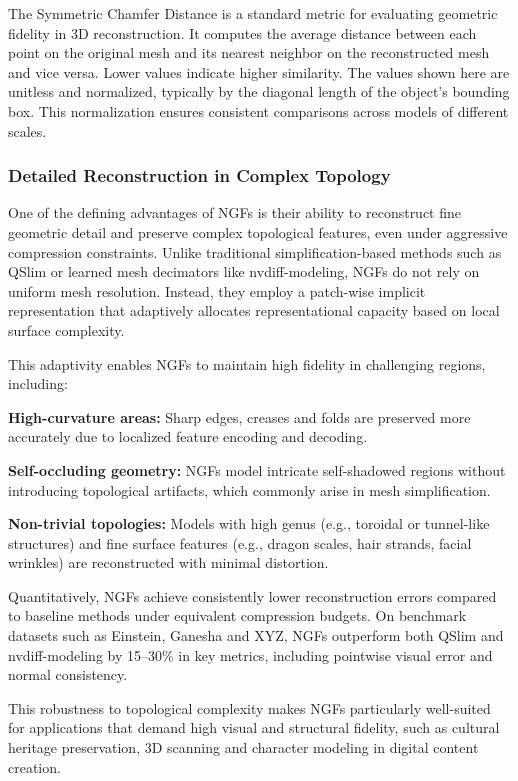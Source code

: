 The Symmetric Chamfer Distance is a standard metric for evaluating geometric fidelity in 3D reconstruction. 
It computes the average distance between each point on the original mesh and its nearest neighbor on the reconstructed mesh and vice versa. 
Lower values indicate higher similarity. 
The values shown here are unitless and normalized, typically by the diagonal length of the object’s bounding box. 
This normalization ensures consistent comparisons across models of different scales. 

\subsubsection{Detailed Reconstruction in Complex Topology}

One of the defining advantages of NGFs is their ability to reconstruct fine geometric detail and preserve complex topological features, even under aggressive compression constraints. 
Unlike traditional simplification-based methods such as QSlim or learned mesh decimators like nvdiff-modeling, NGFs do not rely on uniform mesh resolution. 
Instead, they employ a patch-wise implicit representation that adaptively allocates representational capacity based on local surface complexity. 

This adaptivity enables NGFs to maintain high fidelity in challenging regions, including: 

\textbf{High-curvature areas:} Sharp edges, creases and folds are preserved more accurately due to localized feature encoding and decoding. 

\textbf{Self-occluding geometry:} NGFs model intricate self-shadowed regions without introducing topological artifacts, which commonly arise in mesh simplification. 

\textbf{Non-trivial topologies:} Models with high genus (e.g., toroidal or tunnel-like structures) and fine surface features (e.g., dragon scales, hair strands, facial wrinkles) are reconstructed with minimal distortion. 

Quantitatively, NGFs achieve consistently lower reconstruction errors compared to baseline methods under equivalent compression budgets. 
On benchmark datasets such as Einstein, Ganesha and XYZ, NGFs outperform both QSlim and nvdiff-modeling by 15--30\% in key metrics, including pointwise visual error and normal consistency. 

This robustness to topological complexity makes NGFs particularly well-suited for applications that demand high visual and structural fidelity, such as cultural heritage preservation, 3D scanning and character modeling in digital content creation. 

